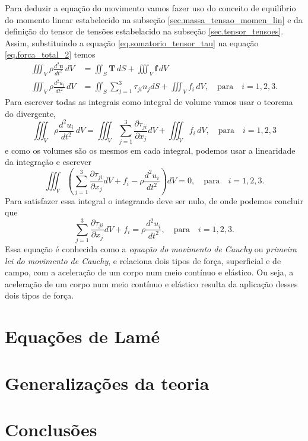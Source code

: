 Para deduzir a equa\c{c}\~ao do movimento vamos fazer uso do conceito de equil\'ibrio do momento linear estabelecido na subse\c{c}\~ao \ref{sec.massa_tensao_momen_lin} e da defini\c{c}\~ao do tensor de tens\~oes estabelacido na subse\c{c}\~ao \ref{sec.tensor_tensoes}. Assim, substituindo a equa\c{c}\~ao \ref{eq.somatorio_tensor_tau} na equa\c{c}\~ao \ref{eq.forca_total_2} temos
\begin{align*}
\iiint_V\rho\frac{d^2\mathbf{u}}{dt^2}\,dV&=\iint_S\mathbf{T}\,dS+\iiint_V\mathbf{f}\,dV\\
\iiint_V\rho\frac{d^2u_i}{dt^2}\,dV&=\iint_S\sum_{j=1}^3\tau_{ji}n_jdS+\iiint_Vf_i\,dV,\quad \text{para}\quad i=1,2,3.
\end{align*}
Para escrever todas as integrais como integral de volume vamos usar o teorema do divergente,
\begin{equation}
\iiint_V\rho\frac{d^2u_i}{dt^2}\,dV=\iiint_V\sum_{j=1}^3\frac{\partial\tau_{ji}}{\partial x_j}dV+\iiint_Vf_i\,dV,\quad \text{para}\quad i=1,2,3
\end{equation}
e como os volumes s\~ao os mesmos em cada integral, podemos usar a linearidade da integra\c{c}\~ao e escrever
\begin{equation}
\iiint_V\left(\sum_{j=1}^3\frac{\partial\tau_{ji}}{\partial x_j}dV+f_i-\rho\frac{d^2u_i}{dt^2}\right)dV=0,\quad \text{para}\quad i=1,2,3.
\end{equation}
Para satisfazer essa integral o integrando deve ser nulo, de onde podemos concluir que
\begin{equation}
\sum_{j=1}^3\frac{\partial\tau_{ji}}{\partial x_j}dV+f_i=\rho\frac{d^2u_i}{dt^2},\quad \text{para}\quad i=1,2,3.
\end{equation}
Essa equa\c{c}\~ao \'e conhecida como a \textit{equa\c{c}\~ao do movimento de Cauchy} ou \textit{primeira lei do movimento de Cauchy}, e relaciona dois tipos de for\c{c}a, superficial e de campo, com a acelera\c{c}\~ao de um corpo num meio cont\'inuo e el\'astico. Ou seja, a acelera\c{c}\~ao de um corpo num meio cont\'inuo e el\'astico resulta da aplica\c{c}\~ao desses dois tipos de for\c{c}a.




\section{Equações de Lamé}

\section{Generalizações da teoria}

\section{Conclusões}